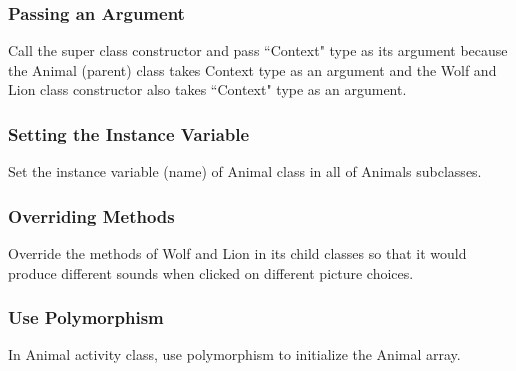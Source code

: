 \subsubsection{Passing an Argument} 
Call the super class constructor and pass ``Context" type as its argument because the Animal (parent) class takes Context type as an argument and the Wolf and Lion class constructor also takes ``Context" type as an argument.

\subsubsection{Setting the Instance Variable} 
Set the instance variable (name) of Animal class in all of Animals subclasses.

\subsubsection{Overriding Methods} 
Override the methods of Wolf and Lion in its child classes so that it would produce different sounds when clicked on different picture choices.

\subsubsection{Use Polymorphism}
In Animal activity class, use polymorphism to initialize the Animal array.




